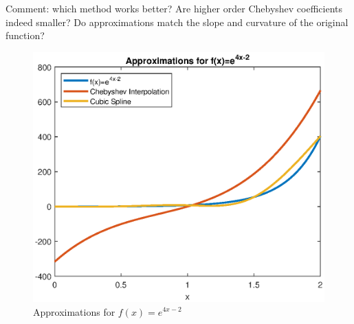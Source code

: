 \documentclass[11pt]{article}
\newcommand{\1}{\mathbbm{1}}
\begin{document}
Comment: which method works better? Are higher order Chebyshev coefficients indeed smaller? Do approximations match the slope and curvature of the original function?

\begin{figure}[h]
	\centering
		\includegraphics[width=\textwidth]{fig1.eps}
	\caption{Approximations for $f(x)=e^{4x-2}$}
	\label{2a:1}
\end{figure}
\end{document}
